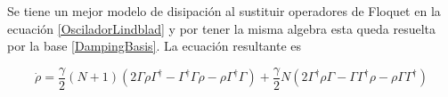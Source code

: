 \documentclass[11pt]{beamer}
\begin{document}
\begin{frame}
Se tiene un mejor modelo de disipación al sustituir operadores de Floquet en la ecuación \eqref{OsciladorLindblad} y por tener la misma algebra esta queda resuelta por la base \eqref{DampingBasis}. La ecuación resultante es

\begin{equation} \label{GammaLindblat}
\dot{\rho}=\frac{\gamma}{2}(N+1)(2\Gamma\rho\Gamma^\dagger - \Gamma^\dagger\Gamma \rho - \rho \Gamma^\dagger \Gamma )
 + \frac{\gamma}{2}N(2\Gamma^\dagger \rho \Gamma - \Gamma \Gamma^\dagger \rho - \rho \Gamma\Gamma^\dagger)
\end{equation}
\end{frame}





\end{document}
